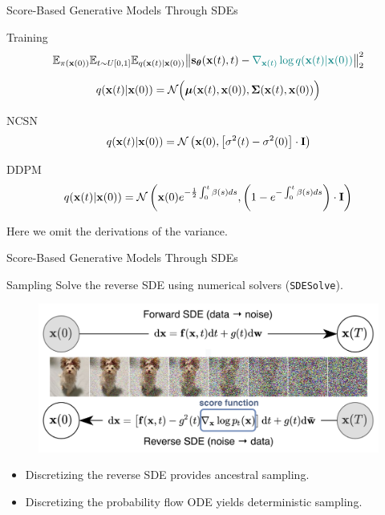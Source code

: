 \documentclass{beamer}
\begin{document}
\begin{frame}{Score-Based Generative Models Through SDEs}
	\begin{block}{Training}
		\vspace{-0.5cm}
		\[
			\mathbb{E}_{\pi(\mathbf{x}(0))} \mathbb{E}_{t \sim U[0, 1]} \mathbb{E}_{q(\mathbf{x}(t) | \mathbf{x}(0))}\bigl\| \mathbf{s}_{\boldsymbol{\theta}}(\mathbf{x}(t), t) - {\color{teal}\nabla_{\mathbf{x}(t)} \log q(\mathbf{x}(t) | \mathbf{x}(0))} \bigr\|^2_2 
		\]
		\vspace{-0.7cm}
	\end{block}
	\[
		q(\mathbf{x}(t) | \mathbf{x}(0)) = \mathcal{N}\Bigl(\boldsymbol{\mu}(\mathbf{x}(t), \mathbf{x}(0)), \boldsymbol{\Sigma}(\mathbf{x}(t), \mathbf{x}(0))\Bigr)
	\]
    \eqpause
	\vspace{-0.5cm}
	\begin{block}{NCSN}
		\vspace{-0.3cm}
		\[
			q(\mathbf{x}(t) | \mathbf{x}(0)) = \mathcal{N}\left(\mathbf{x}(0), \left[\sigma^2(t) - \sigma^2(0)\right] \cdot \mathbf{I}\right)
		\]
		\vspace{-0.5cm}
	\end{block}
    \eqpause
	\begin{block}{DDPM}
		\vspace{-0.5cm}
		\[
			q(\mathbf{x}(t) | \mathbf{x}(0)) = \mathcal{N}\left(\mathbf{x}(0) e^{-\frac{1}{2} \int_0^t\beta(s)ds}, \left(1 - e^{- \int_0^t\beta(s)ds}\right) \cdot \mathbf{I}\right)
		\]
		\vspace{-0.5cm}
	\end{block}
    \eqpause
	Here we omit the derivations of the variance.
	
\end{frame}
\begin{frame}{Score-Based Generative Models Through SDEs}
	\begin{block}{Sampling}
		Solve the reverse SDE using numerical solvers (\texttt{SDESolve}).
		\begin{figure}
			\includegraphics[width=0.8\linewidth]{figs/sbgm}
		\end{figure}
		\vspace{-0.5cm}
	\end{block}
    \eqpause
	\begin{itemize}
		\item Discretizing the reverse SDE provides ancestral sampling.
		\item Discretizing the probability flow ODE yields deterministic sampling.
	\end{itemize}
\end{frame}
\end{document}
